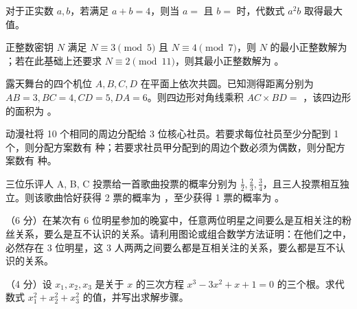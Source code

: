 \begin{questions}
  \item 对于正实数 $a, b$，若满足 $a+b=4$，则当 $a = $ \fillblank 且 $b = $ \fillblank 时，代数式 $a^2b$ 取得最大值。
  \item 正整数密钥 $N$ 满足 $N \equiv 3 \pmod 5$ 且 $N \equiv 4 \pmod 7$，则 $N$ 的最小正整数解为 \fillblank；若在此基础上还要求 $N \equiv 2 \pmod{11}$，则其最小正整数解为 \fillblank。
  \item 露天舞台的四个机位 $A, B, C, D$ 在平面上依次共圆。已知测得距离分别为 $AB = 3, BC = 4, CD = 5, DA = 6$。则四边形对角线乘积 $AC \times BD =$ \fillblank，该四边形的面积为 \fillblank。
  \item 动漫社将 10 个相同的周边分配给 3 位核心社员。若要求每位社员至少分配到 1 个，则分配方案数有 \fillblank 种；若要求社员甲分配到的周边个数必须为偶数，则分配方案数有 \fillblank 种。
  \item 三位乐评人 A, B, C 投票给一首歌曲投票的概率分别为 $\frac{1}{2}, \frac{2}{3}, \frac{3}{4}$，且三人投票相互独立。则该歌曲恰好获得 2 票的概率为 \fillblank，至少获得 1 票的概率为 \fillblank。
\end{questions}

\begin{questions}
  \item （6 分）在某次有 6 位明星参加的晚宴中，任意两位明星之间要么是互相关注的粉丝关系，要么是互不认识的关系。请利用图论或组合数学方法证明：在他们之中，必然存在 3 位明星，这 3 人两两之间要么都是互相关注的关系，要么都是互不认识的关系。
    \answerspace{45mm}
  \item （4 分）设 $x_1, x_2, x_3$ 是关于 $x$ 的三次方程 $x^3 - 3x^2 + x + 1 = 0$ 的三个根。求代数式 $x_1^2 + x_2^2 + x_3^2$ 的值，并写出求解步骤。
    \answerspace{35mm}
\end{questions}


